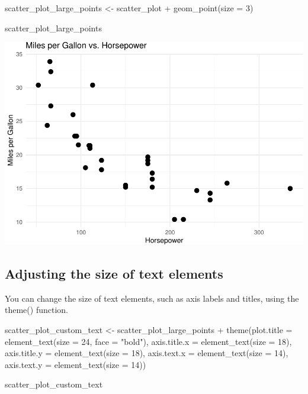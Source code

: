 \documentclass[
]{book}
\newenvironment{Shaded}{\begin{snugshade}}{\end{snugshade}}
\newcommand{\AttributeTok}[1]{\textcolor[rgb]{0.77,0.63,0.00}{#1}}
\newcommand{\DecValTok}[1]{\textcolor[rgb]{0.00,0.00,0.81}{#1}}
\newcommand{\FunctionTok}[1]{\textcolor[rgb]{0.00,0.00,0.00}{#1}}
\newcommand{\NormalTok}[1]{#1}
\newcommand{\OtherTok}[1]{\textcolor[rgb]{0.56,0.35,0.01}{#1}}
\newcommand{\SpecialCharTok}[1]{\textcolor[rgb]{0.00,0.00,0.00}{#1}}
\newcommand{\StringTok}[1]{\textcolor[rgb]{0.31,0.60,0.02}{#1}}
\begin{document}
\begin{Shaded}
\begin{Highlighting}[]
\NormalTok{scatter\_plot\_large\_points }\OtherTok{\textless{}{-}}\NormalTok{ scatter\_plot }\SpecialCharTok{+}
  \FunctionTok{geom\_point}\NormalTok{(}\AttributeTok{size =} \DecValTok{3}\NormalTok{)}

\NormalTok{scatter\_plot\_large\_points}
\end{Highlighting}
\end{Shaded}

\includegraphics[width=1\linewidth]{graphformatting_files/figure-latex/unnamed-chunk-9-1}

\hypertarget{adjusting-the-size-of-text-elements}{%
\subsection{Adjusting the size of text elements}\label{adjusting-the-size-of-text-elements}}

You can change the size of text elements, such as axis labels and titles, using the theme() function.

\begin{Shaded}
\begin{Highlighting}[]
\NormalTok{scatter\_plot\_custom\_text }\OtherTok{\textless{}{-}}\NormalTok{ scatter\_plot\_large\_points }\SpecialCharTok{+}
  \FunctionTok{theme}\NormalTok{(}\AttributeTok{plot.title =} \FunctionTok{element\_text}\NormalTok{(}\AttributeTok{size =} \DecValTok{24}\NormalTok{, }\AttributeTok{face =} \StringTok{"bold"}\NormalTok{),}
        \AttributeTok{axis.title.x =} \FunctionTok{element\_text}\NormalTok{(}\AttributeTok{size =} \DecValTok{18}\NormalTok{),}
        \AttributeTok{axis.title.y =} \FunctionTok{element\_text}\NormalTok{(}\AttributeTok{size =} \DecValTok{18}\NormalTok{),}
        \AttributeTok{axis.text.x =} \FunctionTok{element\_text}\NormalTok{(}\AttributeTok{size =} \DecValTok{14}\NormalTok{),}
        \AttributeTok{axis.text.y =} \FunctionTok{element\_text}\NormalTok{(}\AttributeTok{size =} \DecValTok{14}\NormalTok{))}

\NormalTok{scatter\_plot\_custom\_text}
\end{Highlighting}
\end{Shaded}
\end{document}

